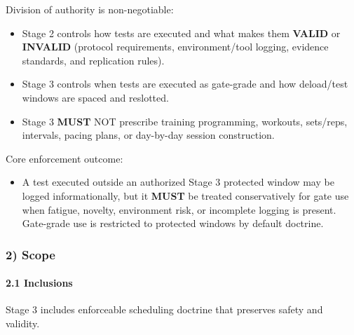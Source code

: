 \documentclass[10pt]{article}
\begin{document}
Division of authority is non-negotiable:

\begin{itemize}
\item Stage 2 controls how tests are executed and what makes them \textbf{VALID} or \textbf{INVALID} (protocol requirements, environment/tool logging, evidence standards, and replication rules).
\item Stage 3 controls when tests are executed as gate-grade and how deload/test windows are spaced and reslotted.
\item Stage 3 \textbf{MUST} NOT prescribe training programming, workouts, sets/reps, intervals, pacing plans, or day-by-day session construction.
\end{itemize}

Core enforcement outcome:

\begin{itemize}
\item A test executed outside an authorized Stage 3 protected window may be logged informationally, but it \textbf{MUST} be treated conservatively for gate use when fatigue, novelty, environment risk, or incomplete logging is present. Gate-grade use is restricted to protected windows by default doctrine.
\end{itemize}

\subsubsection*{2) Scope}

\paragraph*{2.1 Inclusions}

Stage 3 includes enforceable scheduling doctrine that preserves safety and validity.
\end{document}
